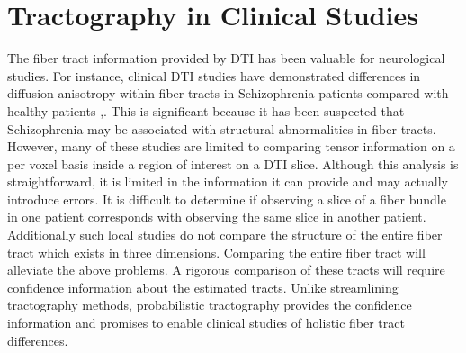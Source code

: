 \section{Tractography in Clinical Studies}
The fiber tract information provided by DTI has been valuable for neurological studies.  For instance, clinical DTI studies have demonstrated differences in diffusion anisotropy within fiber tracts in Schizophrenia patients compared with healthy patients \cite{kubickiBiologPsych03},\cite{kubickiNI05}.  This is significant because it has been suspected that Schizophrenia may be associated with structural abnormalities in fiber tracts.  However, many of these studies are limited to comparing tensor information on a per voxel basis inside a region of interest on a DTI slice.  Although this analysis is straightforward, it is limited in the information it can provide and may actually introduce errors.  It is difficult to determine if observing a slice of a fiber bundle in one patient corresponds with observing the same slice in another patient.  Additionally such local studies do not compare the structure of the entire fiber tract which exists in three dimensions.  Comparing the entire fiber tract will alleviate the above problems.  A rigorous comparison of these tracts will require confidence information about the estimated tracts.  Unlike streamlining tractography methods, probabilistic tractography provides the confidence information and promises to enable clinical studies of holistic fiber tract differences.
